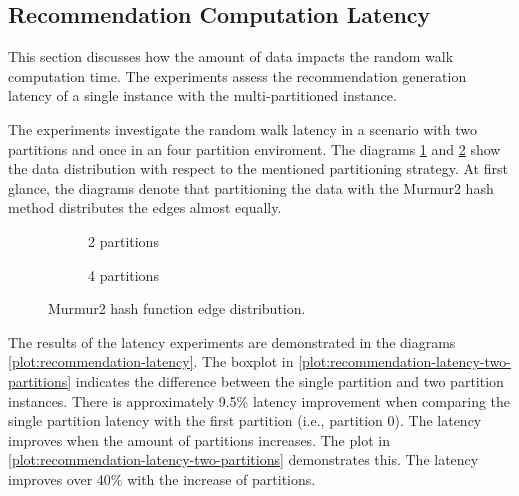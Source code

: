 \subsection{Recommendation Computation Latency}
\label{subsec:recommendation-computation-latency}
This section discusses how the amount of data impacts the random walk computation time. The experiments assess the recommendation generation latency of a single instance with the multi-partitioned instance.


The experiments investigate the random walk latency in a scenario with two partitions and once in an four partition enviroment. The diagrams \ref{plot:edge-distribution-2-partitions-murmur2} and \ref{plot:edge-distribution-4-partitions-murmur2} show the data distribution with respect to the mentioned partitioning strategy. At first glance, the diagrams denote that partitioning the data with the Murmur2 hash method distributes the edges almost equally. 

\begin{figure}[!ht]
    \centering
    \begin{subfigure}{\textwidth}
        \centering
        
        \caption{2 partitions}
        \label{plot:edge-distribution-2-partitions-murmur2}
    \end{subfigure}\qquad

    \begin{subfigure}{\textwidth}
        \centering
        
        \caption{4 partitions}
        \label{plot:edge-distribution-4-partitions-murmur2}
    \end{subfigure}\qquad
    \caption{Murmur2 hash function edge distribution.}
    \label{plot:edge-distirbution-murmur2}
\end{figure}


The results of the latency experiments are demonstrated in the diagrams \ref{plot:recommendation-latency}. The boxplot in \ref{plot:recommendation-latency-two-partitions} indicates the difference between the single partition and two partition instances. There is approximately 9.5\% latency improvement when comparing the single partition latency with the first partition (i.e., partition 0). The latency improves when the amount of partitions increases. The plot in \ref{plot:recommendation-latency-two-partitions} demonstrates this. The latency improves over 40\% with the increase of partitions. 


